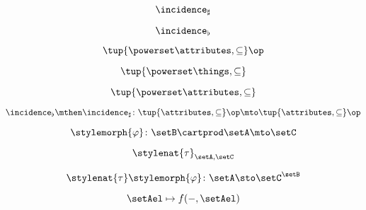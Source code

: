 {\begin{forslides}
        \begin{equation}
            \label{eq:slides_adjunctions_40}
            \incidence_\sharp
        \end{equation}

        \begin{equation}
            \label{eq:slides_adjunctions_41}
            \incidence_\flat
        \end{equation}

        \begin{equation}
            \label{eq:slides_adjunctions_42}
            \tup{\powerset \attributes, \subseteq}\op
        \end{equation}

        \begin{equation}
            \label{eq:slides_adjunctions_43}
            \tup{\powerset \things, \subseteq}
        \end{equation}

        \begin{equation}
            \label{eq:slides_adjunctions_44}
            \tup{\powerset \attributes, \subseteq}
        \end{equation}

        \begin{equation}
            \label{eq:slides_adjunctions_45}
            \incidence_\flat \mthen \incidence_\sharp \colon \tup{\attributes, \subseteq}\op \mto \tup{\attributes, \subseteq}\op
        \end{equation}

        \begin{equation}
            \label{eq:slides_adjunctions_46}
            \stylemorph{\varphi} \colon \setB \cartprod \setA \mto \setC
        \end{equation}

        \begin{equation}
            \label{eq:slides_adjunctions_47}
            \stylenat{\tau}_{\setA,\setC}
        \end{equation}

        \begin{equation}
            \label{eq:slides_adjunctions_48}
            \stylenat{\tau}\stylemorph{\varphi} \colon \setA \sto \setC^\setB
        \end{equation}

        \begin{equation}
            \label{eq:slides_adjunctions_49}
            \setAel \mapsto f( -, \setAel)
        \end{equation}


\end{forslides}}
